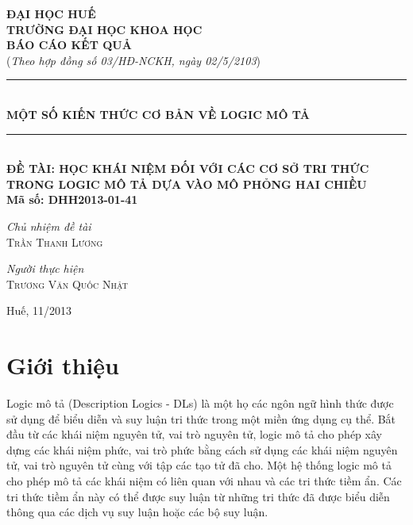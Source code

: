 \documentclass[12pt,a4paper]{report}
\newcommand{\HRule}{\rule{\linewidth}{0.6mm}}
\begin{document}
\begin{titlepage}
\begin{center}

\textsc{\textbf{ĐẠI HỌC HUẾ}}\\[0.0cm]
{\textbf{TRƯỜNG ĐẠI HỌC KHOA HỌC}}\\[4.5cm]

\textsc{\Large \textbf{BÁO CÁO KẾT QUẢ}}\\
(\textit{Theo hợp đồng số 03/HĐ-NCKH, ngày 02/5/2103})\\[0.3cm]
\HRule \\[0.6cm]
{ \LARGE \bfseries MỘT SỐ KIẾN THỨC CƠ BẢN VỀ LOGIC MÔ TẢ}\\[0.4cm]
\HRule \\[0.1cm]
\textbf{ĐỀ TÀI: HỌC KHÁI NIỆM ĐỐI VỚI CÁC CƠ SỞ TRI THỨC TRONG LOGIC MÔ TẢ DỰA VÀO MÔ PHỎNG HAI CHIỀU}\\
\textbf{Mã số: DHH2013-01-41}
\\[1.5cm]
\begin{minipage}{0.4\textwidth}
\begin{flushleft} \large
\emph{Chủ nhiệm đề tài}\\
\textsc{Trần Thanh Lương}
\end{flushleft}
\end{minipage}
\begin{minipage}{0.5\textwidth}
\begin{flushright} \large
\emph{Người thực hiện} \\
\textsc{Trương Văn Quốc Nhật}
\end{flushright}
\end{minipage}

\vfill
Huế, 11/2013

\end{center}
\end{titlepage}
\tableofcontents

\pagebreak[4]

\chapter{Giới thiệu}\label{ch:Introduction}
Logic mô tả (Description Logics - DLs) là một họ các ngôn ngữ hình thức được sử dụng để biểu diễn và suy luận tri thức trong một miền ứng dụng cụ thể. Bắt đầu từ các khái niệm nguyên tử, vai trò nguyên tử, logic mô tả cho phép xây dựng các khái niệm phức, vai trò phức bằng cách sử dụng các khái niệm nguyên tử, vai trò nguyên tử cùng với tập các tạo tử đã cho. Một hệ thống logic mô tả cho phép mô tả các khái niệm có liên quan với nhau và các tri thức tiềm ẩn. Các tri thức tiềm ẩn này có thể được suy luận từ những tri thức đã được biểu diễn thông qua các dịch vụ suy luận hoặc các bộ suy luận.
\end{document}
